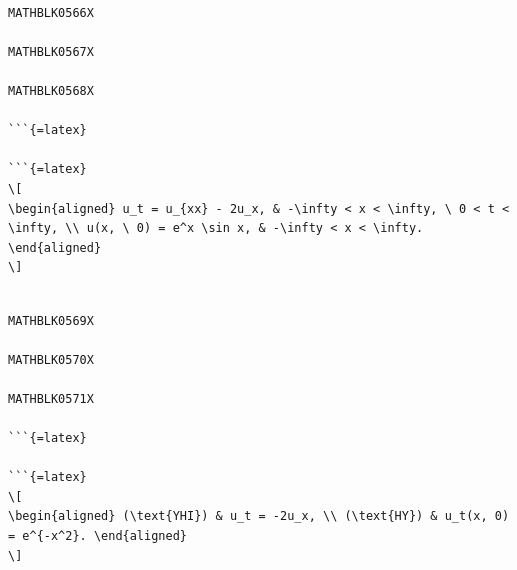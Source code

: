 \documentclass[
]{article}
\begin{document}
\begin{verbatim}

MATHBLK0566X

MATHBLK0567X

MATHBLK0568X

```{=latex}

```{=latex}
\[
\begin{aligned} u_t = u_{xx} - 2u_x, & -\infty < x < \infty, \ 0 < t < \infty, \\ u(x, \ 0) = e^x \sin x, & -\infty < x < \infty. \end{aligned}
\]
\end{verbatim}

\begin{verbatim}

MATHBLK0569X

MATHBLK0570X

MATHBLK0571X

```{=latex}

```{=latex}
\[
\begin{aligned} (\text{YHI}) & u_t = -2u_x, \\ (\text{HY}) & u_t(x, 0) = e^{-x^2}. \end{aligned}
\]
\end{verbatim}
\end{document}
